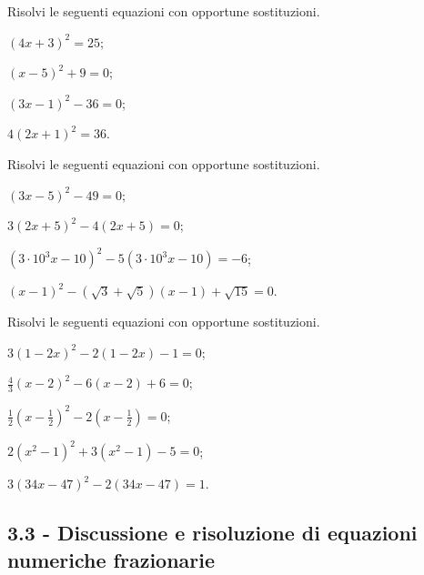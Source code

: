 \begin{esercizio}[\Ast]
 \label{ese:3.36}
Risolvi le seguenti equazioni con opportune sostituzioni.
\begin{multicols}{2}
\begin{enumeratea}
\item $(4x + 3)^{2} = 25$;
\item $(x-5)^{2} + 9 = 0$;
\item $(3x-1)^{2}-36 = 0$;
\item $4 (2x + 1)^{2} = 36$.
\end{enumeratea}
\end{multicols}
\end{esercizio}

\begin{esercizio}[\Ast]
\label{ese:3.37}
Risolvi le seguenti equazioni con opportune sostituzioni.
\begin{multicols}{2}
\begin{enumeratea}
\item $(3x-5)^{2}-49 = 0$;
\item $3 (2x + 5)^{2}-4 (2x + 5) = 0$;
\item $(3 \cdot 10^{3} x-10)^{2}-5 (3 \cdot 10^{3} x-10) = -6$;
\item $(x-1)^{2}-(\sqrt{3} + \sqrt{5}) (x-1) + \sqrt{15} =0$.
\end{enumeratea}
\end{multicols}
\end{esercizio}

\begin{esercizio}[\Ast]
\label{ese:3.38}
Risolvi le seguenti equazioni con opportune sostituzioni.
\begin{multicols}{2}
\begin{enumeratea}
\item $3 (1-2x)^{2}-2 (1-2x)-1 = 0$;
\item $\frac{4}{3} (x-2)^{2}-6 (x-2) + 6 = 0$;
\item $\frac{1}{2} \left(x-\frac{1}{2} \right)^{2}-2 \left(x -\frac{1}{2} \right) = 0$;
\item $2 (x^{2}-1)^{2} + 3 (x^{2}-1)-5 = 0$;
\item $3 (34 x-47)^{2}-2 (34 x-47) = 1$.
\end{enumeratea}
\end{multicols}
\end{esercizio}
\pagebreak
\subsection*{3.3 - Discussione e risoluzione di equazioni numeriche frazionarie}

